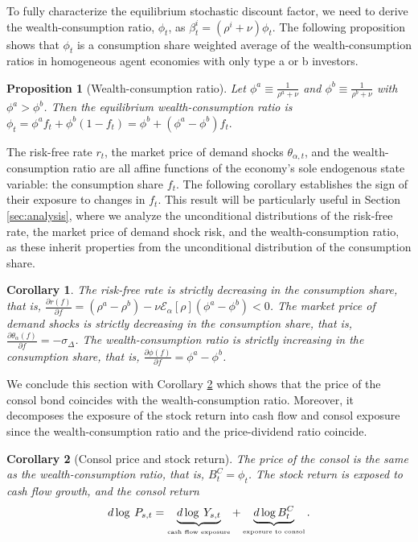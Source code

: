 \documentclass[preprint,11pt,authoryear]{elsarticle}
\theoremstyle{plain}
\newtheorem{prop}{Proposition}
\newtheorem{corollary}{Corollary}
\begin{document}
To fully characterize the equilibrium stochastic discount factor, we need to derive the wealth-consumption ratio, $\phi_t$, as $\beta^i_t = \left(\rho^i + \nu\right)\phi_t$. The following proposition shows that $\phi_t$ is a consumption share weighted average of the wealth-consumption ratios in homogeneous agent economies with only type a or b investors. %
\begin{prop}[Wealth-consumption ratio]\label{prop_PD}
Let $\phi^{a} \equiv \frac{1}{\rho^a+\nu}$ and $\phi^{b} \equiv \frac{1}{\rho^b+\nu}$ with $\phi^{a} > \phi^{b}$. Then the equilibrium wealth-consumption ratio is $\phi_t = \phi^{a}  f_t  + \phi^{b}  (1-f_t)  = \phi^{b} + \left( \phi^{a}-\phi^{b}\right)f_t.$
\end{prop}
The risk-free rate $r_t$, the market price of demand shocks $\theta_{\alpha,t}$, and the wealth-consumption ratio are all affine functions of the economy's sole endogenous state variable: the consumption share $f_t$. The following corollary establishes the sign of their exposure to changes in $f_t$. This result will be particularly useful in Section \ref{sec:analysis}, where we analyze the unconditional distributions of the risk-free rate, the market price of demand shock risk, and the wealth-consumption ratio, as these inherit properties from the unconditional distribution of the consumption share.

\begin{corollary}\label{corollary:affine}
The risk-free rate is strictly decreasing in the consumption share, that is, $\frac{\partial r(f)}{\partial f} = \left(\rho^a-\rho^b\right) - \nu \mathcal{E}_{\alpha} \left [ \rho \right] \left(\phi^a-\phi^b\right)<0$. The market price of demand shocks is strictly decreasing in the consumption share, that is, $\frac{\partial \theta_{\alpha}(f)}{\partial f}= - \sigma_{\Delta}$. The wealth-consumption ratio is strictly increasing in the consumption share, that is, $\frac{\partial \phi(f)}{\partial f}= \phi^{a}-\phi^{b} $.
\end{corollary}

We conclude this section with Corollary \ref{corollary:consol} which shows that the price of the consol bond coincides with the wealth-consumption ratio. Moreover, it decomposes the exposure of the stock return into cash flow and consol exposure since the wealth-consumption ratio and the price-dividend ratio coincide.
\begin{corollary}[Consol price and stock return]\label{corollary:consol}
The price of the consol is the same as the wealth-consumption ratio, that is, $B^{C}_{t} = \phi_t$. The stock return is exposed to cash flow growth, and the consol return
\begin{equation}\label{eq:stockdecompbond}
    d \log \: P_{s,t} = \underbrace{d \log \: Y_{s,t}}_{\text{\tiny cash flow exposure}} + \underbrace{d \log B^{C}_{t} }_{\text{\tiny exposure to consol}}.  
\end{equation}

\end{corollary}
\end{document}
